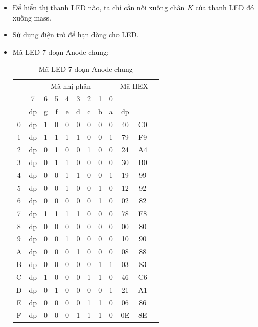 \begin{itemize}
\item Để hiển thị thanh LED nào, ta chỉ cần nối xuống chân $K$ của thanh LED đó xuống mass.
\item Sử dụng điện trở để hạn dòng cho LED.
\item Mã LED 7 đoạn Anode chung:
\begin{table}[!h]
\begin{center}
\begin{tabular}{|c|c|c|c|c|c|c|c|c|c|c|c|}\hline
\multirow{3}{.5cm}{\centering{Số}} & \multicolumn{8}{|c|}{Mã nhị phân} & \multicolumn{2}{|c|}{Mã HEX}\\ \cline{2-9}
& 7 & 6 & 5 & 4 & 3 & 2 & 1 & 0 & \multicolumn{2}{c|}{}\\ \cline{2-11}
& dp & g & f & e & d & c & b & a & dp & \\ \hline
0 & dp & 1 & 0 & 0 & 0 & 0 & 0 & 0 &  40 & C0\\ \hline
1 & dp & 1 & 1 & 1 & 1 & 0 & 0 & 1 &  79 & F9\\ \hline
2 & dp & 0 & 1 & 0 & 0 & 1 & 0 & 0 &  24 & A4\\ \hline
3 & dp & 0 & 1 & 1 & 0 & 0 & 0 & 0 &  30 & B0\\ \hline
4 & dp & 0 & 0 & 1 & 1 & 0 & 0 & 1 &  19 & 99\\ \hline
5 & dp & 0 & 0 & 1 & 0 & 0 & 1 & 0 &  12 & 92\\ \hline
6 & dp & 0 & 0 & 0 & 0 & 0 & 1 & 0 &  02 & 82\\ \hline
7 & dp & 1 & 1 & 1 & 1 & 0 & 0 & 0 &  78 & F8\\ \hline
8 & dp & 0 & 0 & 0 & 0 & 0 & 0 & 0 &  00 & 80\\ \hline
9 & dp & 0 & 0 & 1 & 0 & 0 & 0 & 0 &  10 & 90\\ \hline
A & dp & 0 & 0 & 0 & 1 & 0 & 0 & 0 &  08 & 88\\ \hline
B & dp & 0 & 0 & 0 & 0 & 0 & 1 & 1 &  03 & 83\\ \hline
C & dp & 1 & 0 & 0 & 0 & 1 & 1 & 0 &  46 & C6\\ \hline
D & dp & 0 & 1 & 0 & 0 & 0 & 0 & 1 &  21 & A1\\ \hline
E & dp & 0 & 0 & 0 & 0 & 1 & 1 & 0 &  06 & 86\\ \hline
F & dp & 0 & 0 & 0 & 1 & 1 & 1 & 0 &  0E & 8E\\ \hline
\end{tabular}
\end{center}
\caption{Mã LED 7 đoạn Anode chung}\label{Fig:led-7-seg-anode}
\end{table}
\end{itemize}

